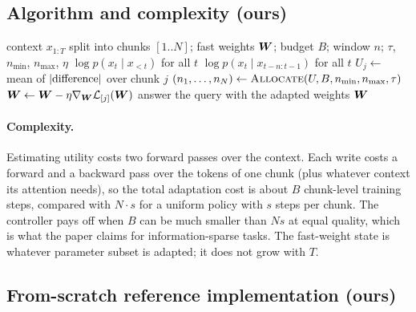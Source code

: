 \subsection{Algorithm and complexity (ours)}

\begin{algorithm}[t]
\caption{A GDWM-style write controller (our formalization).}
\label{alg:c09-gdwm}
\begin{algorithmic}[1]
\Require context $x_{1:T}$ split into chunks $[1..N]$; fast weights $\bm{W}$; budget $B$; window $n$; $\tau$, $n_{\min}$, $n_{\max}$, $\eta$
\State $\log p(x_t\mid x_{<t})$ for all $t$ 
\State $\log p(x_t\mid x_{t-n:t-1})$ for all $t$ 
\State $U_j \gets$ mean of $\left\lvert \text{difference}\right\rvert$ over chunk $j$ \Comment{\eqref{eq:c09-utility}}
\State $(n_1,\dots,n_N) \gets \Call{Allocate}{U, B, n_{\min}, n_{\max}, \tau}$ \Comment{\eqref{eq:c09-alloc}}
    \State $\bm{W} \gets \bm{W} - \eta\nabla_{\bm{W}}\mathcal{L}_{[j]}(\bm{W})$ 
  \EndFor
\EndFor
\State answer the query with the adapted weights $\bm{W}$
\end{algorithmic}
\end{algorithm}

\paragraph{Complexity.} Estimating utility costs two forward passes over the context. Each
write costs a forward and a backward pass over the tokens of one chunk (plus whatever context
its attention needs), so the total adaptation cost is about $B$ chunk-level training steps,
compared with $N\cdot s$ for a uniform policy with $s$ steps per chunk. The controller pays off
when $B$ can be much smaller than $N s$ at equal quality, which is what the paper claims for
information-sparse tasks. The fast-weight state is whatever parameter subset is adapted; it does
not grow with $T$.

\subsection{From-scratch reference implementation (ours)}


